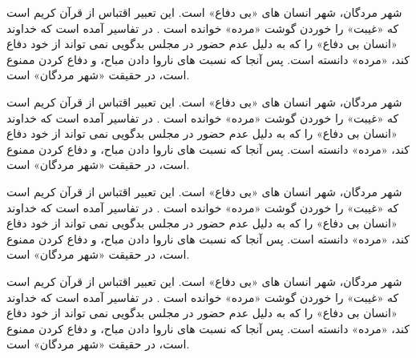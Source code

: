 \documentclass{report}
\begin{document}
\begin{lemma}
شهر مردگان، شهر انسان های «بی دفاع» است. این تعبیر اقتباس از قرآن کریم است که «غیبت» را خوردن گوشت «مرده» خوانده است . در تفاسیر آمده است که خداوند «انسان بی دفاع» را که به دلیل عدم حضور در مجلس بدگویی نمی تواند از خود دفاع کند، «مرده» دانسته است. پس آنجا که نسبت های ناروا دادن مباح، و دفاع کردن ممنوع است، در حقیقت «شهر مردگان» است.
\end{lemma}
\begin{lemmaproof}
شهر مردگان، شهر انسان های «بی دفاع» است. این تعبیر اقتباس از قرآن کریم است که «غیبت» را خوردن گوشت «مرده» خوانده است . در تفاسیر آمده است که خداوند «انسان بی دفاع» را که به دلیل عدم حضور در مجلس بدگویی نمی تواند از خود دفاع کند، «مرده» دانسته است. پس آنجا که نسبت های ناروا دادن مباح، و دفاع کردن ممنوع است، در حقیقت «شهر مردگان» است.
\end{lemmaproof}
\begin{ntremember}
شهر مردگان، شهر انسان های «بی دفاع» است. این تعبیر اقتباس از قرآن کریم است که «غیبت» را خوردن گوشت «مرده» خوانده است . در تفاسیر آمده است که خداوند «انسان بی دفاع» را که به دلیل عدم حضور در مجلس بدگویی نمی تواند از خود دفاع کند، «مرده» دانسته است. پس آنجا که نسبت های ناروا دادن مباح، و دفاع کردن ممنوع است، در حقیقت «شهر مردگان» است.
\end{ntremember}
\begin{ntproblems}
شهر مردگان، شهر انسان های «بی دفاع» است. این تعبیر اقتباس از قرآن کریم است که «غیبت» را خوردن گوشت «مرده» خوانده است . در تفاسیر آمده است که خداوند «انسان بی دفاع» را که به دلیل عدم حضور در مجلس بدگویی نمی تواند از خود دفاع کند، «مرده» دانسته است. پس آنجا که نسبت های ناروا دادن مباح، و دفاع کردن ممنوع است، در حقیقت «شهر مردگان» است.
\end{ntproblems}
\end{document}
